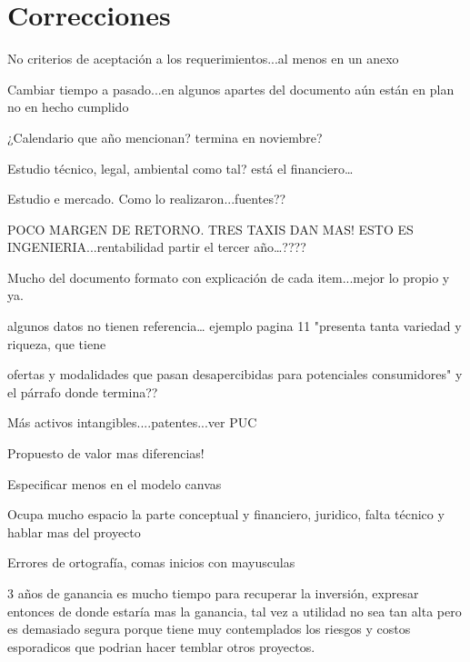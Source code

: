 \section{Correcciones}


No criterios de aceptación a los requerimientos...al menos en un anexo


Cambiar tiempo a pasado...en algunos apartes del documento aún están en plan no en hecho cumplido

¿Calendario que año mencionan? termina en noviembre?

Estudio técnico, legal, ambiental como tal? está el financiero…

Estudio e mercado. Como lo realizaron...fuentes??

POCO MARGEN DE RETORNO. TRES TAXIS DAN MAS! ESTO ES INGENIERIA...rentabilidad partir el tercer año…????

Mucho del documento formato con explicación de cada item...mejor lo propio y ya.

algunos datos no tienen referencia… ejemplo pagina 11 "presenta tanta variedad y riqueza, que tiene

 ofertas y modalidades que pasan desapercibidas para potenciales consumidores" y el párrafo donde termina??

Más activos intangibles....patentes...ver PUC

Propuesto de valor mas diferencias! 


Especificar menos en el modelo canvas

Ocupa mucho espacio la parte conceptual y financiero, juridico, falta técnico y hablar mas del proyecto

Errores de ortografía, comas inicios con mayusculas

3 años de ganancia es mucho tiempo para recuperar la inversión, expresar entonces de donde estaría mas la ganancia, tal vez a utilidad no sea tan alta pero es demasiado segura porque tiene muy contemplados los riesgos y costos esporadicos que podrian hacer temblar otros proyectos. 